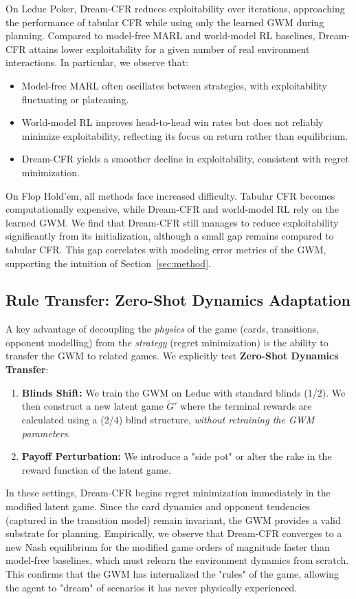 \documentclass{article}
\begin{document}
On Leduc Poker, Dream-CFR reduces exploitability over iterations, approaching the performance of tabular CFR while using only the learned GWM during planning. Compared to model-free MARL and world-model RL baselines, Dream-CFR attains lower exploitability for a given number of real environment interactions. In particular, we observe that:
\begin{itemize}
    \item Model-free MARL often oscillates between strategies, with exploitability fluctuating or plateauing.
    \item World-model RL improves head-to-head win rates but does not reliably minimize exploitability, reflecting its focus on return rather than equilibrium.
    \item Dream-CFR yields a smoother decline in exploitability, consistent with regret minimization.
\end{itemize}

On Flop Hold'em, all methods face increased difficulty. Tabular CFR becomes computationally expensive, while Dream-CFR and world-model RL rely on the learned GWM. We find that Dream-CFR still manages to reduce exploitability significantly from its initialization, although a small gap remains compared to tabular CFR. This gap correlates with modeling error metrics of the GWM, supporting the intuition of Section~\ref{sec:method}.

\subsection{Rule Transfer: Zero-Shot Dynamics Adaptation}

A key advantage of decoupling the \emph{physics} of the game (cards, transitions, opponent modelling) from the \emph{strategy} (regret minimization) is the ability to transfer the GWM to related games. We explicitly test \textbf{Zero-Shot Dynamics Transfer}:
\begin{enumerate}
    \item \textbf{Blinds Shift:} We train the GWM on Leduc with standard blinds (1/2). We then construct a new latent game $\tilde{G}'$ where the terminal rewards are calculated using a (2/4) blind structure, \emph{without retraining the GWM parameters}.
    \item \textbf{Payoff Perturbation:} We introduce a "side pot" or alter the rake in the reward function of the latent game.
\end{enumerate}

In these settings, Dream-CFR begins regret minimization immediately in the modified latent game. Since the card dynamics and opponent tendencies (captured in the transition model) remain invariant, the GWM provides a valid substrate for planning. Empirically, we observe that Dream-CFR converges to a new Nash equilibrium for the modified game orders of magnitude faster than model-free baselines, which must relearn the environment dynamics from scratch. This confirms that the GWM has internalized the "rules" of the game, allowing the agent to "dream" of scenarios it has never physically experienced.
\end{document}
